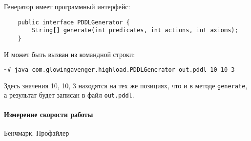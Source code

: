 Генератор имеет программный интерфейс:

\begin{lstlisting}
    public interface PDDLGenerator {
        String[] generate(int predicates, int actions, int axioms);
    }
\end{lstlisting}

И может быть вызван из командной строки:

\begin{verbatim}
~# java com.glowingavenger.highload.PDDLGenerator out.pddl 10 10 3
\end{verbatim}

Здесь значения 10, 10, 3 находятся на тех же позициях, что и в методе
\texttt{generate}, а результат будет записан в файл \texttt{out.pddl}.

\paragraph{Измерение скорости работы}

Бенчмарк. Профайлер
